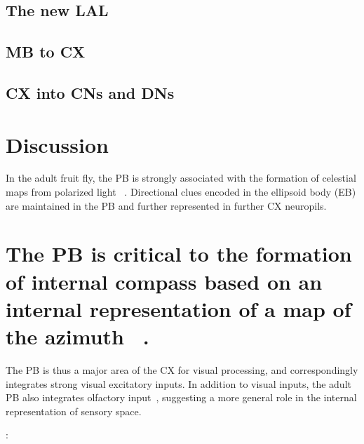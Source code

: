 \documentclass{article}
\begin{document}

\subsection{The new LAL}
\subsection{MB to CX}
\subsection{CX into CNs and DNs}




\section{Discussion}


In the adult fruit fly, the PB is strongly associated with the formation of celestial maps from polarized light ~\citep{heinze2009transformation, lin2013comprehensive}.
Directional clues encoded in the ellipsoid body (EB) are maintained in the PB and further represented in further CX neuropils.
\section{The PB is critical to the formation of internal compass based on an internal representation of a map of the azimuth ~\citep{heinze2017unraveling}.}
The PB is thus a major area of the CX for visual processing, and correspondingly integrates strong visual excitatory inputs.
In addition to visual inputs, the adult PB also integrates olfactory input~\citep{MISSING}, suggesting a more general role in the internal representation of sensory space.


:
\end{document}
